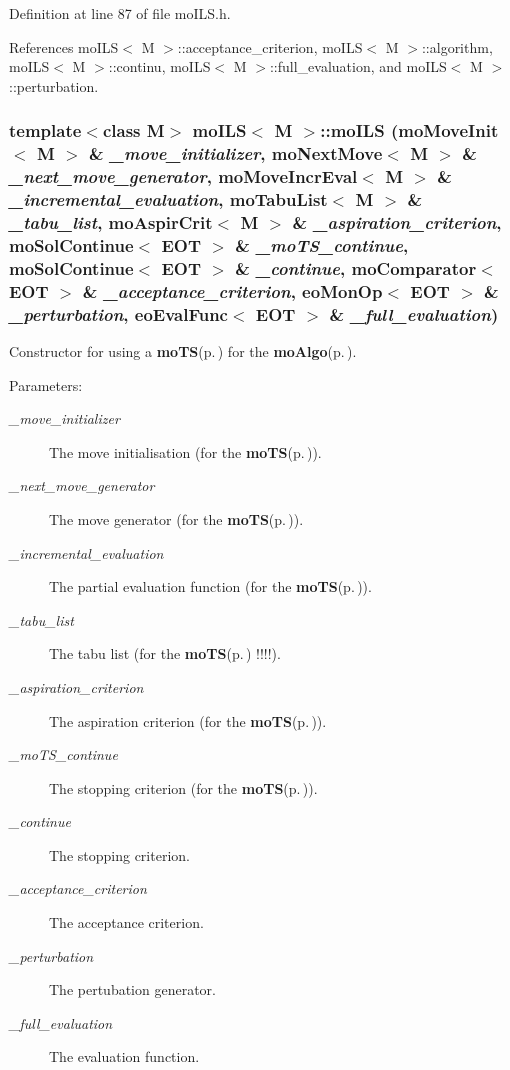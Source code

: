 Definition at line 87 of file mo\-ILS.h.

References mo\-ILS$<$ M $>$::acceptance\_\-criterion, mo\-ILS$<$ M $>$::algorithm, mo\-ILS$<$ M $>$::continu, mo\-ILS$<$ M $>$::full\_\-evaluation, and mo\-ILS$<$ M $>$::perturbation.
\subsubsection{\setlength{\rightskip}{0pt plus 5cm}template$<$class M$>$ {\bf mo\-ILS}$<$ M $>$::{\bf mo\-ILS} ({\bf mo\-Move\-Init}$<$ M $>$ \& {\em \_\-move\_\-initializer}, {\bf mo\-Next\-Move}$<$ M $>$ \& {\em \_\-next\_\-move\_\-generator}, {\bf mo\-Move\-Incr\-Eval}$<$ M $>$ \& {\em \_\-incremental\_\-evaluation}, {\bf mo\-Tabu\-List}$<$ M $>$ \& {\em \_\-tabu\_\-list}, {\bf mo\-Aspir\-Crit}$<$ M $>$ \& {\em \_\-aspiration\_\-criterion}, {\bf mo\-Sol\-Continue}$<$ {\bf EOT} $>$ \& {\em \_\-mo\-TS\_\-continue}, {\bf mo\-Sol\-Continue}$<$ {\bf EOT} $>$ \& {\em \_\-continue}, {\bf mo\-Comparator}$<$ {\bf EOT} $>$ \& {\em \_\-acceptance\_\-criterion}, {\bf eo\-Mon\-Op}$<$ {\bf EOT} $>$ \& {\em \_\-perturbation}, {\bf eo\-Eval\-Func}$<$ {\bf EOT} $>$ \& {\em \_\-full\_\-evaluation})\hspace{0.3cm}{\tt  [inline]}}\label{classmo_i_l_s_a2}


Constructor for using a {\bf mo\-TS}{\rm (p.\,\pageref{classmo_t_s})} for the {\bf mo\-Algo}{\rm (p.\,\pageref{classmo_algo})}. 

\begin{Desc}
\item[Parameters:]
\begin{description}
\item[{\em \_\-move\_\-initializer}]The move initialisation (for the {\bf mo\-TS}{\rm (p.\,\pageref{classmo_t_s})}). \item[{\em \_\-next\_\-move\_\-generator}]The move generator (for the {\bf mo\-TS}{\rm (p.\,\pageref{classmo_t_s})}). \item[{\em \_\-incremental\_\-evaluation}]The partial evaluation function (for the {\bf mo\-TS}{\rm (p.\,\pageref{classmo_t_s})}). \item[{\em \_\-tabu\_\-list}]The tabu list (for the {\bf mo\-TS}{\rm (p.\,\pageref{classmo_t_s})} !!!!). \item[{\em \_\-aspiration\_\-criterion}]The aspiration criterion (for the {\bf mo\-TS}{\rm (p.\,\pageref{classmo_t_s})}). \item[{\em \_\-mo\-TS\_\-continue}]The stopping criterion (for the {\bf mo\-TS}{\rm (p.\,\pageref{classmo_t_s})}). \item[{\em \_\-continue}]The stopping criterion. \item[{\em \_\-acceptance\_\-criterion}]The acceptance criterion. \item[{\em \_\-perturbation}]The pertubation generator. \item[{\em \_\-full\_\-evaluation}]The evaluation function. \end{description}
\end{Desc}


